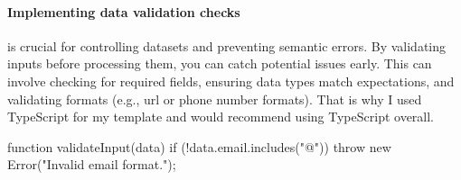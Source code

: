 \paragraph{Implementing data validation checks} is crucial for controlling datasets and preventing semantic errors.
By validating inputs before processing them, you can catch potential issues early.
This can involve checking for
required fields, ensuring data types match
expectations, and validating formats (e.g., url or phone number formats).
That is why I used TypeScript for my template and would recommend using TypeScript overall.
\begin{mytsbox}
    function validateInput(data) {
        if (!data.email.includes("@")) {
            throw new Error("Invalid email format.");
        }
    }
\end{mytsbox}

